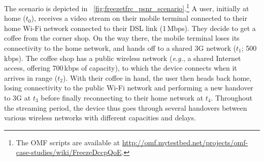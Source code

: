 \documentclass[twocolumn]{nictatechreport}
\newcommand{\latinlocution}[1]{\textit{#1}}
\newcommand{\eg}{\latinlocution{e.g.}}
\begin{document}
The scenario is depicted in
\figurename~\ref{fig:freezetfrc_psnr_scenario}.\footnote{The OMF scripts are
available at
\url{http://omf.mytestbed.net/projects/omf-case-studies/wiki/FreezeDccpQoE}.} A
user, initially at home ($t_0$), receives a video stream on their mobile
terminal connected to their home Wi-Fi network connected to their DSL link
(1\,Mbps).  They decide to get a coffee from the corner shop. On the way there,
the mobile terminal loses its connectivity to the home network, and hands off to
a shared 3G network ($t_1$; 500\,kbps). The coffee shop has a public wireless network
(\eg, a shared Internet access, offering 700\,kbps of capacity), to which the
device connects when it arrives in range ($t_2$).  With their coffee in hand,
the user then heads back home, losing connectivity to the public Wi-Fi network
and performing a new handover to 3G at $t_3$ before finally reconnecting to
their home network at $t_4$.  Throughout the streaming period, the device thus
goes through several handovers between various wireless networks with different
capacities and delays.
\end{document}
